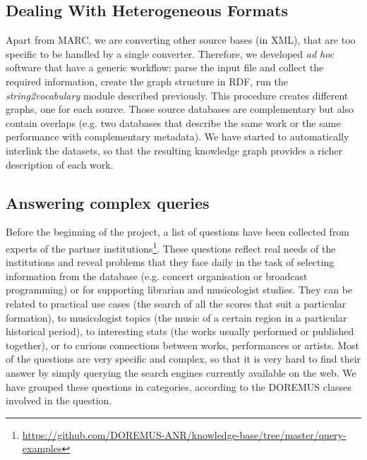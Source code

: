 \subsection{Dealing With Heterogeneous Formats}
Apart from MARC, we are converting other source bases (in XML), that are too specific to be handled by a single converter. Therefore, we developed \textit{ad hoc} software that have a generic workflow: parse the input file and collect the required information, create the graph structure in RDF, run the \textit{string2vocabulary} module described previously. This procedure creates different graphs, one for each source. Those source databases are complementary but also contain overlaps (e.g. two databases that describe the same work or the same performance with complementary metadata). We have started to automatically interlink the datasets, so that the resulting knowledge graph provides a richer description of each work.

\subsection{Answering complex queries}
Before the beginning of the project, a list of questions have been collected from experts of the partner institutions\footnote{\url{https://github.com/DOREMUS-ANR/knowledge-base/tree/master/query-examples}}. These questions reflect real needs of the institutions and reveal problems that they face daily in the task of selecting information from the database (e.g. concert organisation or broadcast programming) or for supporting librarian and musicologist studies. They can be related to practical use cases (the search of all the scores that suit a particular formation), to musicologist topics (the music of a certain region in a particular historical period), to interesting stats (the works usually performed or published together), or to curious connections between works, performances or artists. Most of the questions are very specific and complex, so that it is very hard to find their answer by simply querying the search engines currently available on the web. We have grouped these questions in categories, according to the DOREMUS classes involved in the question.


